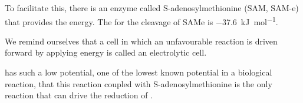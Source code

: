 \documentclass[../mit-general-chemistry.tex]{subfiles}
\begin{document}
To facilitate this, there is an enzyme called S-adenosylmethionine
(SAM, SAM-e) that provides the energy. The \gibbsO for the cleavage of
SAMe is \SI{-37.6}{\kilo\joule\per\mol}.

\begin{remark}
  We remind ourselves that a cell in which an unfavourable reaction is
  driven forward by applying energy is called an electrolytic cell.
\end{remark}

 has such a low potential, one of the lowest known potential
in a biological reaction, that this reaction coupled with
S-adenosylmethionine is the only reaction that can drive the reduction
of .




\summary
\end{document}
